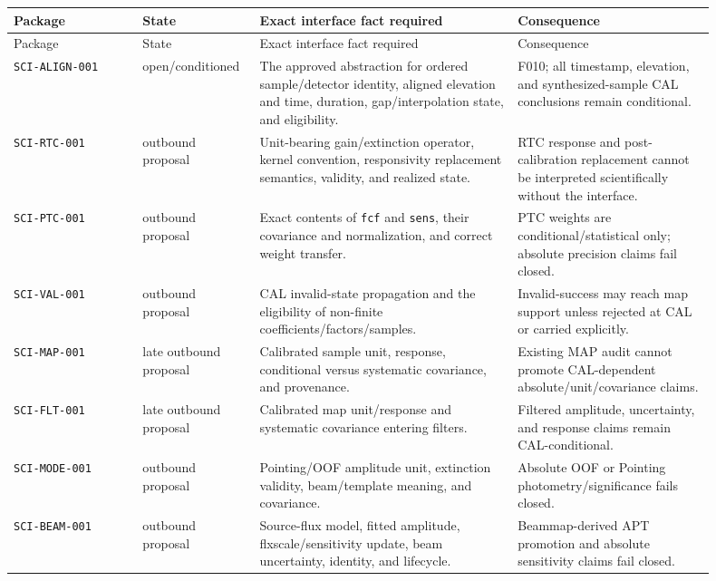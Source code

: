 \documentclass[11pt]{article}
\newcommand{\code}[1]{\nolinkurl{#1}}
\begin{document}
\begin{longtable}{L{0.17\linewidth}L{0.13\linewidth}L{0.34\linewidth}L{0.26\linewidth}}
\toprule
Package & State & Exact interface fact required & Consequence\\
\midrule
\endfirsthead
\toprule
Package & State & Exact interface fact required & Consequence\\
\midrule
\endhead
\code{SCI-ALIGN-001} & open/\allowbreak conditioned & The approved abstraction for ordered
sample/detector identity, aligned elevation and time, duration,
gap/interpolation state, and eligibility. & F010; all timestamp, elevation,
and synthesized-sample CAL conclusions remain conditional.\\
\code{SCI-RTC-001} & outbound proposal & Unit-bearing gain/extinction operator,
kernel convention, responsivity replacement semantics, validity, and realized
state. & RTC response and post-calibration replacement cannot be interpreted
scientifically without the interface.\\
\code{SCI-PTC-001} & outbound proposal & Exact contents of \code{fcf} and
\code{sens}, their covariance and normalization, and correct weight transfer.
& PTC weights are conditional/statistical only; absolute precision claims
fail closed.\\
\code{SCI-VAL-001} & outbound proposal & CAL invalid-state propagation and the
eligibility of non-finite coefficients/factors/samples. & Invalid-success may
reach map support unless rejected at CAL or carried explicitly.\\
\code{SCI-MAP-001} & late outbound proposal & Calibrated sample unit, response,
conditional versus systematic covariance, and provenance. & Existing MAP
audit cannot promote CAL-dependent absolute/unit/covariance claims.\\
\code{SCI-FLT-001} & late outbound proposal & Calibrated map unit/response and
systematic covariance entering filters. & Filtered amplitude, uncertainty,
and response claims remain CAL-conditional.\\
\code{SCI-MODE-001} & outbound proposal & Pointing/OOF amplitude unit,
extinction validity, beam/template meaning, and covariance. & Absolute OOF or
Pointing photometry/significance fails closed.\\
\code{SCI-BEAM-001} & outbound proposal & Source-flux model, fitted amplitude,
flxscale/sensitivity update, beam uncertainty, identity, and lifecycle. &
Beammap-derived APT promotion and absolute sensitivity claims fail closed.\\
\bottomrule
\end{longtable}
\end{document}
